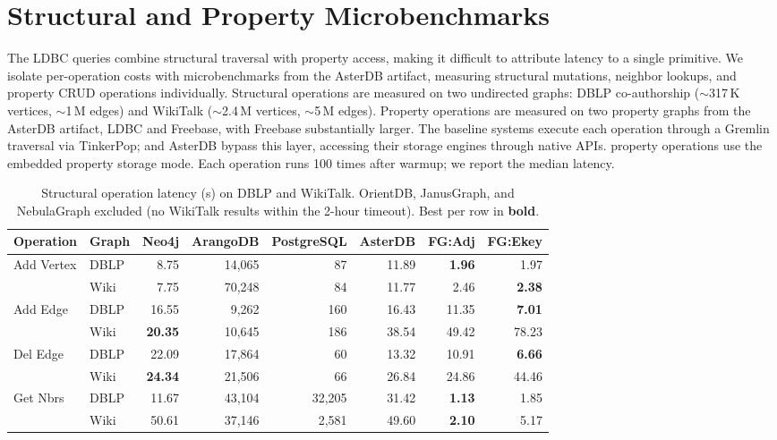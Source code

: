 \section{Structural and Property Microbenchmarks}
\label{sec:eval:microbenchmarks}

The LDBC queries combine structural traversal with property access, making it difficult to attribute latency to a single primitive.
We isolate per-operation costs with microbenchmarks from the AsterDB artifact, measuring structural mutations, neighbor lookups, and property CRUD operations individually.
Structural operations are measured on two undirected graphs: DBLP co-authorship (${\sim}$317\,K vertices, ${\sim}$1\,M edges) and WikiTalk (${\sim}$2.4\,M vertices, ${\sim}$5\,M edges).
Property operations are measured on two property graphs from the AsterDB artifact, LDBC and Freebase, with Freebase substantially larger.
The baseline systems execute each operation through a Gremlin traversal via TinkerPop; \project{} and AsterDB bypass this layer, accessing their storage engines through native APIs.
\project{} property operations use the embedded property storage mode.
Each operation runs 100 times after warmup; we report the median latency.

\begin{table}[t]
  \centering
  \footnotesize
  \setlength{\tabcolsep}{2pt}
  \begin{tabular*}{\columnwidth}{@{\extracolsep{\fill}}ll rrrrrr@{}}
    \toprule
    Operation & Graph & Neo4j & ArangoDB & PostgreSQL & AsterDB & FG:Adj & FG:Ekey \\
    \midrule
    \multirow{2}{*}{Add Vertex}
    & DBLP & 8.75 & 14{,}065 & 87 & 11.89 & \textbf{1.96} & 1.97 \\
    & Wiki & 7.75 & 70{,}248 & 84 & 11.77 & 2.46 & \textbf{2.38} \\
    \midrule
    \multirow{2}{*}{Add Edge}
    & DBLP & 16.55 & 9{,}262 & 160 & 16.43 & 11.35 & \textbf{7.01} \\
    & Wiki & \textbf{20.35} & 10{,}645 & 186 & 38.54 & 49.42 & 78.23 \\
    \midrule
    \multirow{2}{*}{Del Edge}
    & DBLP & 22.09 & 17{,}864 & 60 & 13.32 & 10.91 & \textbf{6.66} \\
    & Wiki & \textbf{24.34} & 21{,}506 & 66 & 26.84 & 24.86 & 44.46 \\
    \midrule
    \multirow{2}{*}{Get Nbrs}
    & DBLP & 11.67 & 43{,}104 & 32{,}205 & 31.42 & \textbf{1.13} & 1.85 \\
    & Wiki & 50.61 & 37{,}146 & 2{,}581 & 49.60 & \textbf{2.10} & 5.17 \\
    \bottomrule
  \end{tabular*}
  \caption{Structural operation latency (\textmu{}s) on DBLP and WikiTalk.
    OrientDB, JanusGraph, and NebulaGraph excluded (no WikiTalk results within the 2-hour timeout).
    Best per row in \textbf{bold}.}
  \label{tab:structural-ops}
\end{table}

